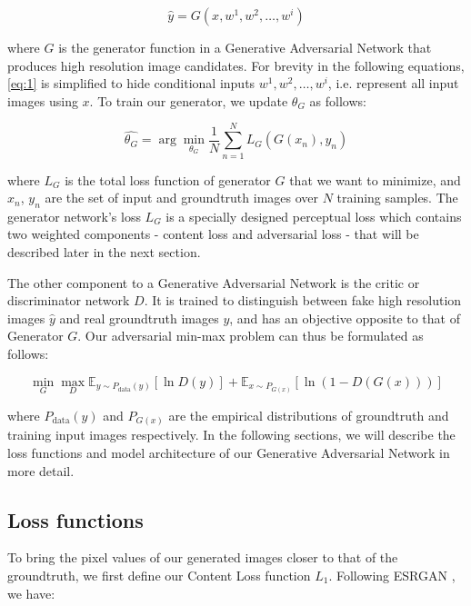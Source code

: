 \documentclass[tc, manuscript]{copernicus}
\begin{document}
\begin{equation}\label{eq:1}
  \hat{y} = G(x, w^1, w^2, \dots, w^i)
\end{equation}

where $G$ is the generator function in a Generative Adversarial Network that produces high resolution image candidates.
For brevity in the following equations, \eqref{eq:1} is simplified to hide conditional inputs $w^1, w^2, \dots, w^i$, i.e. represent all input images using $x$.
To train our generator, we update $\theta_G$ as follows:

\begin{equation}\label{eq:2}
  \hat{\theta_G} = \arg\min_{\theta_G} \frac{1}{N}\sum_{n=1}^{N}L_G(G(x_n), y_n)
\end{equation}

where $L_G$ is the total loss function of generator $G$ that we want to minimize, and $x_n$, $y_n$ are the set of input and groundtruth images over $N$ training samples.
The generator network's loss $L_G$ is a specially designed perceptual loss which contains two weighted components - content loss and adversarial loss - that will be described later in the next section.

The other component to a Generative Adversarial Network is the critic or discriminator network $D$.
It is trained to distinguish between fake high resolution images $\hat{y}$ and real groundtruth images $y$, and has an objective opposite to that of Generator $G$.
Our adversarial min-max problem can thus be formulated as follows:

\begin{equation}\label{eq:3}
  \min_{G} \max_{D} \mathbb{E}_{y \sim P_{\text{data}}(y)}[\ln D(y)] + \mathbb{E}_{x \sim P_{G(x)}}[\ln(1-D(G(x)))]
\end{equation}

where $P_{\text{data}}(y)$ and $P_{G(x)}$ are the empirical distributions of groundtruth and training input images respectively.
In the following sections, we will describe the loss functions and model architecture of our Generative Adversarial Network in more detail.

\subsection{Loss functions}

To bring the pixel values of our generated images closer to that of the groundtruth, we first define our Content Loss function $L_1$.
Following ESRGAN \citep{WangESRGANEnhancedSuperResolution2018}, we have:
\end{document}
